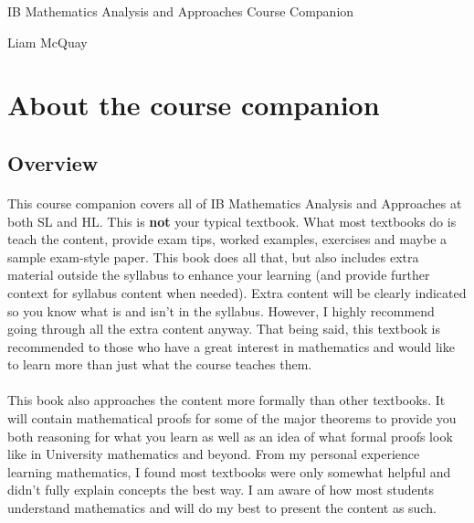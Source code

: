 \documentclass[12pt, a4paper, titlepage, twoside]{article}
\begin{document}
	\begin{titlepage}
  	\null\vfill

  	\begin{center}
  		{\Huge IB Mathematics Analysis and Approaches} \vskip 2cm
  		{\Large Course Companion} \vskip 1cm
 	\end{center}

	\vfill
	\vfill
	
	\begin{center}
  		{\Large Liam McQuay}
 	\end{center}

	\end{titlepage}

	\newpage
	
	\tableofcontents
	
	\newpage
	
\section{About the course companion}

	\subsection*{Overview}

	\paragraph{}
	This course companion covers all of IB Mathematics Analysis and Approaches at both SL and HL. This 
	is \textbf{not} your typical textbook. What most textbooks do is teach the content, provide exam tips, 		
	worked examples, exercises and maybe a sample exam-style paper.
	This book does all that, but also includes extra material outside the syllabus to enhance your learning (and provide further context for 	
	syllabus content when needed). Extra content will be clearly indicated so you know what is and isn't in the syllabus. However, I highly 
	recommend going through all the extra content anyway. That being said, this textbook is recommended to those who have a great
	interest in mathematics and would like to learn more than just what the course teaches them.

	\paragraph{}
	This book also approaches the content more formally than other textbooks. It will contain mathematical proofs for some of the 
	major theorems to provide you both reasoning for what you learn as well as an idea of what formal proofs look like in University 
	mathematics and beyond. From my personal experience learning mathematics, I found most textbooks were only somewhat helpful and 
	didn't fully explain concepts the best way. I am aware of how most students understand mathematics and will do my best to present the 
	content as such. 
\end{document}
